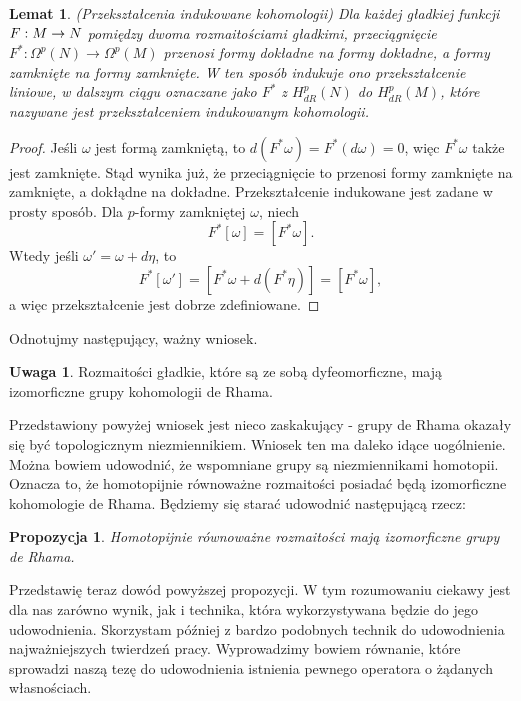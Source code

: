 \documentclass[licencjacka]{pracamgr}
\theoremstyle{definition}
\theoremstyle{definition}
\newtheorem{remark}{Uwaga}[section]
\theoremstyle{plain}
\newtheorem{lemma}{Lemat}[section]
\theoremstyle{plain}
\newtheorem{proposition}{Propozycja}[section]
\theoremstyle{plain}
\theoremstyle{plain}
\def\M{\ensuremath M}
\begin{document}
\begin{lemma}(Przekształcenia indukowane kohomologii)
  Dla każdej gładkiej funkcji $F: \M \rightarrow N$ pomiędzy
  dwoma rozmaitościami gładkimi, przeciągnięcie 
  $F^\ast: \Omega^p(N) \rightarrow \Omega^p (M)$ przenosi formy dokładne
  na formy dokładne, a formy zamknięte na formy zamknięte. W ten sposób indukuje
  ono przekształcenie liniowe, w dalszym ciągu oznaczane jako $F^\ast$ z
  $H^p_{dR} (N)$ do $H^p_{dR} (M)$, które nazywane jest przekształceniem indukowanym
  kohomologii. \\
\end{lemma}
\begin{proof}
  Jeśli $\omega$ jest formą zamkniętą, to $d(F^\ast \omega) = F^\ast(d \omega) = 0$,
  więc $F^\ast \omega$ także jest zamknięte. Stąd wynika już, że przeciągnięcie
  to przenosi formy zamknięte na zamknięte, a dokłądne na dokładne. Przekształcenie
  indukowane jest zadane w prosty sposób. Dla $p$-formy zamkniętej $\omega$, niech
  \[
  F^\ast[\omega] = [F^\ast\omega].
  \]
  Wtedy jeśli $\omega' = \omega + d \eta$, to 
  \[
  F^\ast[\omega'] = [F^\ast\omega + d(F^\ast\eta)] = [F^\ast\omega],
  \]
  a więc przekształcenie jest dobrze zdefiniowane.
\end{proof} 
Odnotujmy następujący, ważny wniosek.

\begin{remark}
  Rozmaitości gładkie, które są ze sobą dyfeomorficzne, mają izomorficzne grupy
  kohomologii de Rhama. \\
\end{remark}



Przedstawiony powyżej wniosek jest nieco zaskakujący - grupy de Rhama okazały
się być topologicznym niezmiennikiem. Wniosek ten ma daleko idące uogólnienie.
Można bowiem udowodnić, że wspomniane grupy są niezmiennikami homotopii. Oznacza
to, że homotopijnie równoważne rozmaitości posiadać będą izomorficzne kohomologie
de Rhama. Będziemy się starać udowodnić następującą rzecz:

\begin{proposition}\label{homotopy-de-Rham}
    Homotopijnie równoważne rozmaitości mają izomorficzne grupy de Rhama.
\end{proposition}

Przedstawię teraz dowód powyższej propozycji.  W tym rozumowaniu ciekawy jest
dla nas zarówno wynik, jak i technika, która wykorzystywana będzie do jego
udowodnienia.  Skorzystam później z bardzo podobnych technik do udowodnienia
najważniejszych twierdzeń pracy.  Wyprowadzimy bowiem równanie, które sprowadzi
naszą tezę do udowodnienia istnienia pewnego operatora o żądanych własnościach.  \\
\end{document}
